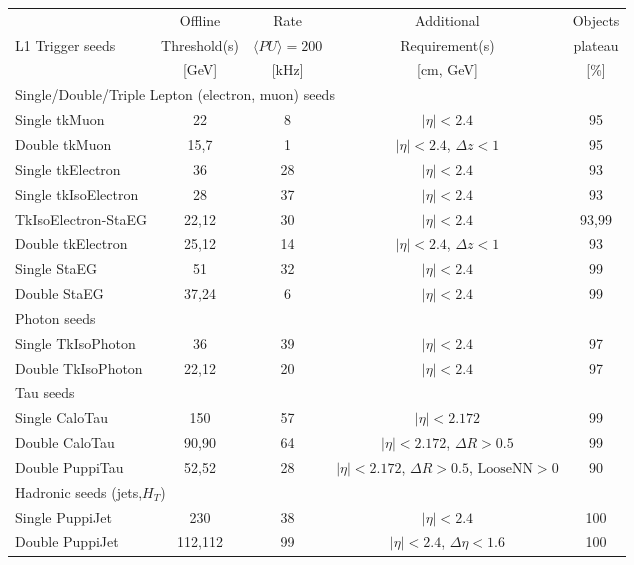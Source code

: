 \documentclass{article}
\newcommand{\HT}{\ensuremath{H_{T}}\xspace}
\begin{document}
\begin{table}[th] 
\label{tab:Step1p2Menu} 
\begin{adjustbox}{width=\textwidth}
{\scriptsize
\begin{tabular}	{|l|c|c|c|c|} 
\hline	             &	  Offline   & 	Rate  &  Additional & Objects    \\
       L1 Trigger seeds &  Threshold(s)  &  $\langle {PU} \rangle = 200$ &  Requirement(s)  & plateau   \\
	                 &  [GeV]  &  [kHz]  &   [cm, GeV]  & [\%]	\\   
\hline
\hline \multicolumn{5}{|l|}{Single/Double/Triple Lepton (electron, muon) seeds} \\
\hline Single tkMuon & 22 & 8 & $|\eta|<2.4$ & 95\\
\hline Double tkMuon & 15,7 & 1 & $|\eta|<2.4$, ${\Delta}z <1$ & 95\\
\hline Single tkElectron & 36 & 28 & $|\eta|<2.4$ & 93\\
\hline Single tkIsoElectron & 28 & 37 & $|\eta|<2.4$ & 93\\
\hline TkIsoElectron-StaEG & 22,12 & 30 & $|\eta|<2.4$ & 93,99\\
\hline Double tkElectron & 25,12 & 14 & $|\eta|<2.4$, ${\Delta}z <1$ & 93\\
\hline Single StaEG & 51 & 32 & $|\eta|<2.4$ & 99\\
\hline Double StaEG & 37,24 & 6 & $|\eta|<2.4$ & 99\\
\hline
\hline \multicolumn{5}{|l|}{Photon seeds} \\
\hline Single TkIsoPhoton & 36 & 39 & $|\eta|<2.4$ & 97\\
\hline Double TkIsoPhoton & 22,12 & 20 & $|\eta|<2.4$ & 97\\
\hline
\hline \multicolumn{5}{|l|}{Tau seeds} \\
\hline Single CaloTau & 150 & 57 & $|\eta|<2.172$ & 99\\
\hline Double CaloTau & 90,90 & 64 & $|\eta|<2.172$, ${\Delta}R >0.5$ & 99\\
\hline Double PuppiTau & 52,52 & 28 & $|\eta|<2.172$, ${\Delta}R >0.5$, $\text{LooseNN} > 0$ & 90\\
\hline
\hline \multicolumn{5}{|l|}{Hadronic seeds (jets,\HT)} \\
\hline Single PuppiJet & 230 & 38 & $|\eta|<2.4$ & 100\\
\hline Double PuppiJet & 112,112 & 99 & $|\eta|<2.4$, ${\Delta}\eta <1.6$ & 100\\

\end{tabular}}
\end{adjustbox}
\end{table}
\end{document}

